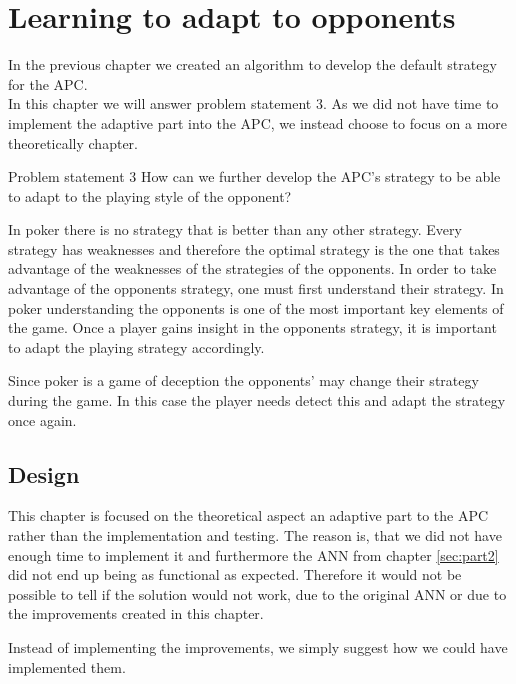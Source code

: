 	\section{Learning to adapt to opponents}
\label{sec:part3}

In the previous chapter we created an algorithm to develop the default strategy for the APC. \\

In this chapter we will answer problem statement 3.
As we did not have time to implement the adaptive part into the APC, we instead choose to focus on a more theoretically chapter.


\vspace{4mm}
\begin{statementBox2}{Problem statement 3}
How can we further develop the APC's strategy to be able to adapt to the playing style of the opponent?
\end{statementBox2}
\vspace{4mm} 


In poker there is no strategy that is better than any other strategy. Every strategy has weaknesses and therefore the optimal strategy is the one that takes advantage of the weaknesses of the strategies of the opponents. In order to take advantage of the opponents strategy, one must first understand their strategy. In poker understanding the opponents is one of the most important key elements of the game. Once a player gains insight in the opponents strategy, it is important to adapt the playing strategy accordingly.


Since poker is a game of deception the opponents' may change their strategy during the game. In this case the player needs detect this and adapt the strategy once again. 

\subsection{Design}
This chapter is focused on the theoretical aspect an adaptive part to the APC rather than the implementation and testing. The reason is, that we did not have enough time to implement it and furthermore the ANN from chapter \ref{sec:part2} did not end up being as functional as expected. Therefore it would not be possible to tell if the solution would not work, due to the original ANN or due to the improvements created in this chapter. 

Instead of implementing the improvements, we simply suggest how we could have implemented them.\\

